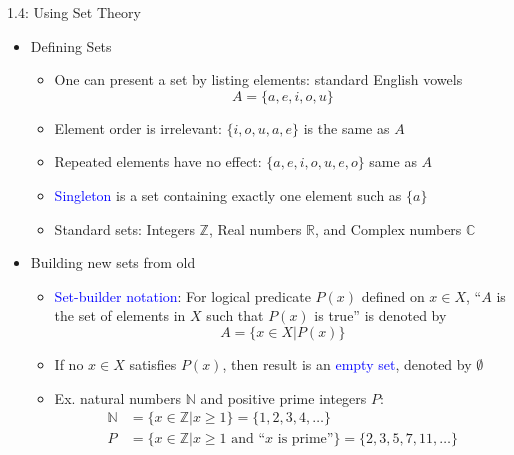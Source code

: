 \documentclass[10pt,english]{beamer}
\begin{document}
\begin{frame}{1.4: Using Set Theory}

\begin{itemize}
\setlength\itemsep{3mm}
\item<1-> Defining Sets \vspace{1mm}
\begin{itemize} 
  \setlength\itemsep{1.5mm}
  \item One can present a set by listing elements: standard English vowels \[A= \{ a,e,i,o,u \} \]
  \item Element order is irrelevant: $\{ i,o,u,a,e \}$ is the same as $A$
  \item Repeated elements have no effect: $\{ a,e,i,o,u,e,o \}$ same as $A$
  \item \textcolor{blue}{Singleton} is a set containing exactly one element such as $\{a\}$
  \item Standard sets: Integers $\mathbb{Z}$, Real numbers $\mathbb{R}$, and Complex numbers $\mathbb{C}$
\end{itemize}

\item<2-> Building new sets from old \vspace{1mm}
\begin{itemize} 
  \setlength\itemsep{1.5mm}
  \item \textcolor{blue}{Set-builder notation}: For logical predicate $P(x)$ defined on $x\in X$, ``$A$ is the set of elements in $X$ such that $P(x)$ is true'' is denoted by
\[ A = \{ x\in X | P(x) \} \]
  \item If no $x\in X$ satisfies $P(x)$, then result is an \textcolor{blue}{empty set}, denoted by $\emptyset$
  \item Ex. natural numbers $\mathbb{N}$ and positive prime integers $P$:
\begin{align*}
  \mathbb{N} &= \{ x\in \mathbb{Z} | x\geq 1 \} = \{ 1,2,3,4,\ldots \} \\
  P &= \{ x\in \mathbb{Z} | x\geq 1 \textrm{ and ``}x\textrm{ is prime''} \} = \{ 2,3,5,7,11,\ldots \}
\end{align*}
\end{itemize}
\end{itemize}
\end{frame}

\iffalse
\begin{frame}{Intervals?}

\begin{itemize}
\setlength\itemsep{3mm}
\item<1-> Defining Sets \vspace{1mm}
\begin{itemize} 
  \setlength\itemsep{1.5mm}


\end{itemize}
\end{itemize}
\end{frame}
\fi
\end{document}
